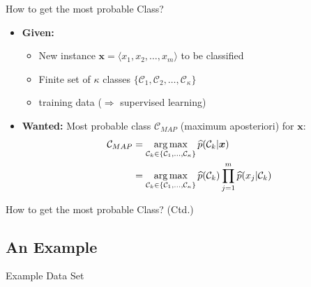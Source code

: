 \begin{frame}{How to get the most probable Class?}{}\important
	\begin{itemize}
		\item \textbf{Given:}
		\begin{itemize}
			\item New instance $\bm{x} = \langle x_1, x_2, \dots, x_m \rangle$ to be classified
			\item Finite set of $\kappa$ classes $\{ \mathcal{C}_1, \mathcal{C}_2, \dots, \mathcal{C}_{\kappa} \}$
			\item {} training data ($\Rightarrow$ supervised learning)
		\end{itemize}
		\item \textbf{Wanted:} Most probable class $\mathcal{C}_{MAP}$ (maximum aposteriori) for $\bm{x}$:
		\begin{align}
			\mathcal{C}_{MAP}
				&= \operatorname*{arg\,max}_{\mathcal{C}_k \in \{ \mathcal{C}_1, \dots, \mathcal{C}_{\kappa} \}} 
					\widehat{p}(\mathcal{C}_k \vert \bm{x}) \\
				&= \operatorname*{arg\,max}_{\mathcal{C}_k \in \{ \mathcal{C}_1, \dots, \mathcal{C}_{\kappa} \}} 
					\widehat{p}(\mathcal{C}_k) \prod_{j=1}^m \widehat{p}(x_j \vert \mathcal{C}_k)
		\end{align}
	\end{itemize}
\end{frame}


\begin{frame}{How to get the most probable Class? (Ctd.)}{}
	\vspace*{-2mm}
	
\end{frame}


\subsection{An Example}

\begin{frame}{Example Data Set}{}
	
\end{frame}


